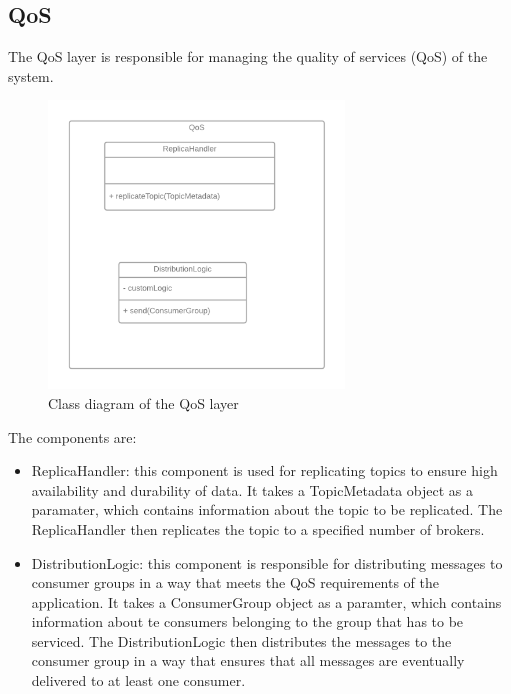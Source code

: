 \subsection{QoS}

The QoS layer is responsible for managing the quality of services (QoS) of the
system.

\begin{figure}[H]
    \centering
    \includegraphics[width=0.7\textwidth]{Figures/class_diagram_QoS.png}
    \caption{Class diagram of the QoS layer}
\end{figure}

The components are:

\begin{itemize}
    \item   ReplicaHandler: this component is used for replicating topics to
            ensure high availability and durability of data. It takes a
            TopicMetadata object as a paramater, which contains information
            about the topic to be replicated. The ReplicaHandler then
            replicates the topic to a specified number of brokers.
    \item   DistributionLogic: this component is responsible for distributing
            messages to consumer groups in a way that meets the QoS
            requirements of the application. It takes a ConsumerGroup object
            as a paramter, which contains information about te consumers
            belonging to the group that has to be serviced.
            The DistributionLogic then distributes the messages to the consumer
            group in a way that ensures that all messages are eventually
            delivered to at least one consumer.
\end{itemize}

